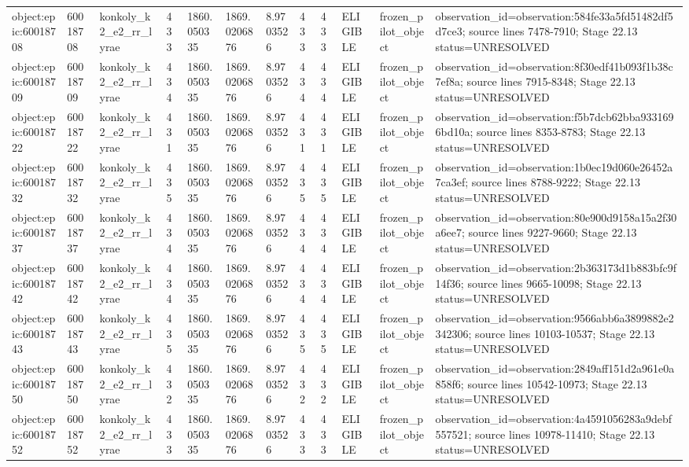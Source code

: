 \begin{longtable}{llllllllllll}
object:epic:60018708 & 60018708 & konkoly\_k2\_e2\_rr\_lyrae & 433 & 1860.050335 & 1869.0206876 & 8.9703526 & 433 & 433 & ELIGIBLE & frozen\_pilot\_object & observation\_id=observation:584fe33a5fd51482df5d7ce3; source lines 7478-7910; Stage 22.13 status=UNRESOLVED \\
object:epic:60018709 & 60018709 & konkoly\_k2\_e2\_rr\_lyrae & 434 & 1860.050335 & 1869.0206876 & 8.9703526 & 434 & 434 & ELIGIBLE & frozen\_pilot\_object & observation\_id=observation:8f30edf41b093f1b38c7ef8a; source lines 7915-8348; Stage 22.13 status=UNRESOLVED \\
object:epic:60018722 & 60018722 & konkoly\_k2\_e2\_rr\_lyrae & 431 & 1860.050335 & 1869.0206876 & 8.9703526 & 431 & 431 & ELIGIBLE & frozen\_pilot\_object & observation\_id=observation:f5b7dcb62bba9331696bd10a; source lines 8353-8783; Stage 22.13 status=UNRESOLVED \\
object:epic:60018732 & 60018732 & konkoly\_k2\_e2\_rr\_lyrae & 435 & 1860.050335 & 1869.0206876 & 8.9703526 & 435 & 435 & ELIGIBLE & frozen\_pilot\_object & observation\_id=observation:1b0ec19d060e26452a7ca3ef; source lines 8788-9222; Stage 22.13 status=UNRESOLVED \\
object:epic:60018737 & 60018737 & konkoly\_k2\_e2\_rr\_lyrae & 434 & 1860.050335 & 1869.0206876 & 8.9703526 & 434 & 434 & ELIGIBLE & frozen\_pilot\_object & observation\_id=observation:80e900d9158a15a2f30a6ee7; source lines 9227-9660; Stage 22.13 status=UNRESOLVED \\
object:epic:60018742 & 60018742 & konkoly\_k2\_e2\_rr\_lyrae & 434 & 1860.050335 & 1869.0206876 & 8.9703526 & 434 & 434 & ELIGIBLE & frozen\_pilot\_object & observation\_id=observation:2b363173d1b883bfc9f14f36; source lines 9665-10098; Stage 22.13 status=UNRESOLVED \\
object:epic:60018743 & 60018743 & konkoly\_k2\_e2\_rr\_lyrae & 435 & 1860.050335 & 1869.0206876 & 8.9703526 & 435 & 435 & ELIGIBLE & frozen\_pilot\_object & observation\_id=observation:9566abb6a3899882e2342306; source lines 10103-10537; Stage 22.13 status=UNRESOLVED \\
object:epic:60018750 & 60018750 & konkoly\_k2\_e2\_rr\_lyrae & 432 & 1860.050335 & 1869.0206876 & 8.9703526 & 432 & 432 & ELIGIBLE & frozen\_pilot\_object & observation\_id=observation:2849aff151d2a961e0a858f6; source lines 10542-10973; Stage 22.13 status=UNRESOLVED \\
object:epic:60018752 & 60018752 & konkoly\_k2\_e2\_rr\_lyrae & 433 & 1860.050335 & 1869.0206876 & 8.9703526 & 433 & 433 & ELIGIBLE & frozen\_pilot\_object & observation\_id=observation:4a4591056283a9debf557521; source lines 10978-11410; Stage 22.13 status=UNRESOLVED \\

\end{longtable}
